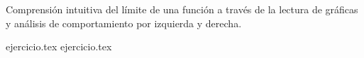 
Comprensión intuitiva del límite de una función a través de la lectura de gráficas y análisis de comportamiento por izquierda y derecha.

\begin{enumerate}
    {ejercicio.tex}
    \setcounter{enumi}{4}
    {ejercicio.tex}
\end{enumerate}
